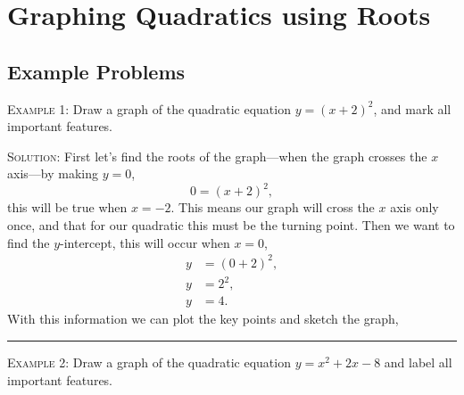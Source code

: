 \documentclass[a4paper,12pt]{article}
\begin{document}
\section*{Graphing Quadratics using Roots}

\subsection*{Example Problems}

\textsc{Example 1}: Draw a graph of the quadratic equation $y = (x + 2)^2$, 
and mark all important features.

\textsc{Solution}: First let's find the roots of the graph---when the graph 
crosses the $x$ axis---by making $y = 0$, 
$$0 = (x+2)^2,$$
this will be true when $x = -2$. This means our graph will cross the 
$x$ axis only once, and that for our quadratic this must be the turning 
point. Then we want to find the $y$-intercept, this will occur when 
$x = 0$,
\begin{align*}
y &= (0 + 2)^2, \\
y &= 2^2, \\
y &= 4.
\end{align*}
With this information we can plot the key points and sketch the graph,


\vspace{3mm}
\hrule
\vspace{3mm}

\textsc{Example 2}: Draw a graph of the quadratic equation $y = x^2 + 2x - 8$
and label all important features.
\end{document}
